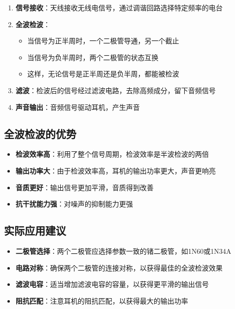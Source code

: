 \documentclass[12pt,UTF8]{ctexbook}
\begin{document}
\begin{enumerate}
\item \textbf{信号接收}：天线接收无线电信号，通过调谐回路选择特定频率的电台
\item \textbf{全波检波}：
  \begin{itemize}[leftmargin=3.5em]
  \item 当信号为正半周时，一个二极管导通，另一个截止
  \item 当信号为负半周时，两个二极管的状态互换
  \item 这样，无论信号是正半周还是负半周，都能被检波
  \end{itemize}
\item \textbf{滤波}：检波后的信号经过滤波电路，去除高频成分，留下音频信号
\item \textbf{声音输出}：音频信号驱动耳机，产生声音
\end{enumerate}

\subsection{全波检波的优势}

\begin{itemize}[leftmargin=3.5em]
\item \textbf{检波效率高}：利用了整个信号周期，检波效率是半波检波的两倍
\item \textbf{输出功率大}：由于检波效率高，耳机的输出功率更大，声音更响亮
\item \textbf{音质更好}：输出信号更加平滑，音质得到改善
\item \textbf{抗干扰能力强}：对噪声的抑制能力更强
\end{itemize}

\subsection{实际应用建议}

\begin{itemize}[leftmargin=3.5em]
\item \textbf{二极管选择}：两个二极管应选择参数一致的锗二极管，如1N60或1N34A
\item \textbf{电路对称}：确保两个二极管的连接对称，以获得最佳的全波检波效果
\item \textbf{滤波电容}：适当增加滤波电容的容量，以获得更平滑的输出信号
\item \textbf{阻抗匹配}：注意耳机的阻抗匹配，以获得最大的输出功率
\end{itemize}
\end{document}
